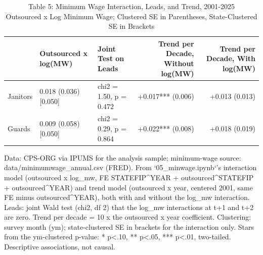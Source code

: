 \begin{table}[!t]
\caption*{
{\large Table 5: Minimum Wage Interaction, Leads, and Trend, 2001-2025} \\
{\small Outsourced x Log Minimum Wage; Clustered SE in Parentheses, State-Clustered SE in Brackets}
} 

\fontsize{10.0pt}{12.0pt}\selectfont

\begin{tabular*}{\linewidth}{@{\extracolsep{\fill}}l|llrr}
\toprule
  & Outsourced x log(MW) & Joint Test on Leads & Trend per Decade, Without log(MW) & Trend per Decade, With log(MW) \\ 
\midrule\addlinespace[2.5pt]
Janitors & 0.018 (0.036) [0.050] & chi2 = 1.50, p = 0.472 & +0.017*** (0.006) & +0.013 (0.013) \\
Guards & 0.009 (0.058) [0.050] & chi2 = 0.29, p = 0.864 & +0.022*** (0.008) & +0.018 (0.019) \\
\bottomrule
\end{tabular*}
\begin{minipage}{\linewidth}
Data: CPS-ORG via IPUMS for the analysis sample; minimum-wage source: data/minimumwage\_annual.csv (FRED). From `05\_minwage.ipynb`'s interaction model (outsourced x log\_mw, FE STATEFIP\textasciicircum{}YEAR + outsourced\textasciicircum{}STATEFIP + outsourced\textasciicircum{}YEAR) and trend model (outsourced x year, centered 2001, same FE minus outsourced\textasciicircum{}YEAR), both with and without the log\_mw interaction. Leads: joint Wald test (chi2, df 2) that the log\_mw interactions at t+1 and t+2 are zero. Trend per decade = 10 x the outsourced x year coefficient. Clustering: survey month (ym); state-clustered SE in brackets for the interaction only. Stars from the ym-clustered p-value: * p<.10, ** p<.05, *** p<.01, two-tailed. Descriptive associations, not causal.\\
\end{minipage}
\end{table}

